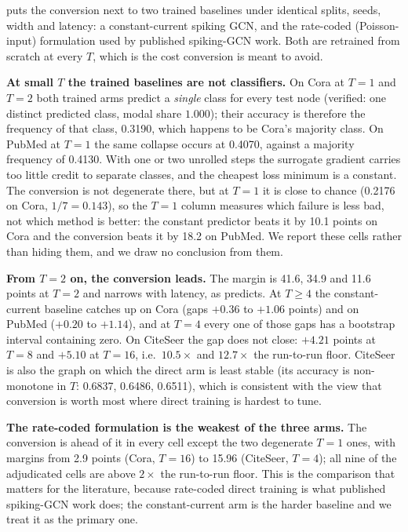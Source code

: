  puts the conversion next to two trained baselines under identical splits,
seeds, width and latency: a constant-current spiking GCN, and the rate-coded (Poisson-input)
formulation used by published spiking-GCN work. Both are retrained from scratch at every $T$, which
is the cost conversion is meant to avoid.

\textbf{At small $T$ the trained baselines are not classifiers.} On Cora at $T=1$ and $T=2$ both
trained arms predict a \emph{single} class for every test node (verified: one distinct predicted
class, modal share $1.000$); their accuracy is therefore the frequency of that class, 0.3190, which
happens to be Cora's majority class. On PubMed at $T=1$ the same collapse occurs at 0.4070, against
a majority frequency of 0.4130. With one or two unrolled steps the surrogate gradient carries too
little credit to separate classes, and the cheapest loss minimum is a constant. The conversion is
not degenerate there, but at $T=1$ it is close to chance (0.2176 on Cora, $1/7 = 0.143$), so the
$T=1$ column measures which failure is less bad, not which method is better: the constant predictor
beats it by 10.1 points on Cora and the conversion beats it by 18.2 on PubMed. We report these cells
rather than hiding them, and we draw no conclusion from them.

\textbf{From $T=2$ on, the conversion leads.} The margin is 41.6, 34.9 and 11.6 points at $T=2$ and
narrows with latency, as  predicts. At $T \ge 4$ the constant-current baseline
catches up on Cora (gaps $+0.36$ to $+1.06$ points) and on PubMed ($+0.20$ to $+1.14$), and at
$T=4$ every one of those gaps has a bootstrap interval containing zero. On CiteSeer the gap does not
close: $+4.21$ points at $T=8$ and $+5.10$ at $T=16$, i.e.\ $10.5\times$ and $12.7\times$ the
run-to-run floor. CiteSeer is also the graph on which the direct arm is least stable (its accuracy
is non-monotone in $T$: 0.6837, 0.6486, 0.6511), which is consistent with the view that conversion
is worth most where direct training is hardest to tune.

\textbf{The rate-coded formulation is the weakest of the three arms.} The conversion is ahead of it
in every cell except the two degenerate $T=1$ ones, with margins from 2.9 points (Cora, $T=16$) to
15.96 (CiteSeer, $T=4$); all nine of the adjudicated cells are above $2\times$ the run-to-run floor.
This is the
comparison that matters for the literature, because rate-coded direct training is what published
spiking-GCN work does; the constant-current arm is the harder baseline and we treat it as the
primary one.

